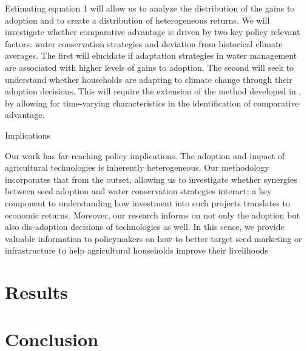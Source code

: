 \documentclass{article}
\begin{document}
Estimating equation 1 will allow us  to analyze the distribution of the gains to adoption and to create a distribution of heterogeneous returns. We will investigate whether comparative advantage is driven by two key policy relevant factors: water conservation strategies and deviation from historical climate averages. The first will elucidate if adaptation strategies in water management are associated with higher levels of gains to adoption. The second will seek to understand whether households are adapting to climate change through their adoption decisions. This will require the extension of the method developed in \citep{Tjernstrom_Emilia_Dalia_Ghanem_Oscar_Barriga_Cabanillas_Travis_J_Lybbert_Jeffrey_D_Michler_and_Aleksandr_Michuda2020-bc}, by allowing for time-varying characteristics in the identification of comparative advantage.

Implications 

Our work has far-reaching policy implications. The adoption and impact of agricultural technologies is inherently heterogeneous. Our methodology incorporates that from the outset, allowing us to investigate whether synergies between seed adoption and water conservation strategies interact; a key component to understanding how investment into such projects translates to economic returns. Moreover, our research informs on not only the adoption but also dis-adoption decisions of technologies as well. In this sense, we provide valuable information to policymakers on how to better target seed marketing or infrastructure to help agricultural households improve their livelihoods

\section{Results}

\section{Conclusion}


\end{document}
